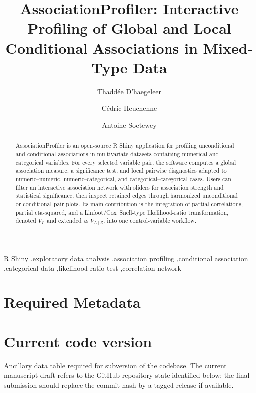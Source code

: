 \documentclass[preprint,12pt,a4paper]{elsarticle}
\numberwithin{equation}{section}
\begin{document}
\renewcommand{\labelenumii}{\arabic{enumi}.\arabic{enumii}}

\begin{frontmatter}

\title{AssociationProfiler: Interactive Profiling of Global and Local Conditional Associations in Mixed-Type Data}

\author[aff1]{Thadd\'ee D'haegeleer}
\author[aff1,aff2]{C\'edric Heuchenne}
\author[aff1,aff2]{Antoine Soetewey}
\address[aff1]{TODO: affiliation}
\address[aff2]{TODO: affiliation}

\begin{abstract}
AssociationProfiler is an open-source R Shiny application for profiling unconditional and conditional associations in multivariate datasets containing numerical and categorical variables. For every selected variable pair, the software computes a global association measure, a significance test, and local pairwise diagnostics adapted to numeric--numeric, numeric--categorical, and categorical--categorical cases. Users can filter an interactive association network with sliders for association strength and statistical significance, then inspect retained edges through harmonized unconditional or conditional pair plots. Its main contribution is the integration of partial correlations, partial eta-squared, and a Linfoot/Cox--Snell-type likelihood-ratio transformation, denoted $V_L$ and extended as $V_{L\mid Z}$, into one control-variable workflow.
\end{abstract}

\begin{keyword}
R Shiny \sep exploratory data analysis \sep association profiling \sep conditional association \sep categorical data \sep likelihood-ratio test \sep correlation network
\end{keyword}

\end{frontmatter}

\section*{Required Metadata}

\section*{Current code version}

Ancillary data table required for subversion of the codebase. The current manuscript draft refers to the GitHub repository state identified below; the final submission should replace the commit hash by a tagged release if available.
\end{document}
